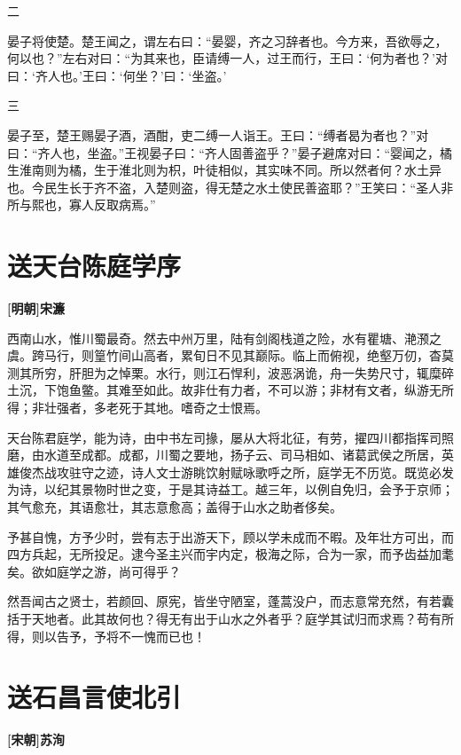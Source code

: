 \documentclass[UTF8,titlepage,oneside]{ctexbook}
\begin{document}
二

晏子将使楚。楚王闻之，谓左右曰：“晏婴，齐之习辞者也。今方来，吾欲辱之，何以也？”左右对曰：“为其来也，臣请缚一人，过王而行，王曰：‘何为者也？’对曰：‘齐人也。’王曰：‘何坐？’曰：‘坐盗。’


三

晏子至，楚王赐晏子酒，酒酣，吏二缚一人诣王。王曰：“缚者曷为者也？”对曰：“齐人也，坐盗。”王视晏子曰：“齐人固善盗乎？”晏子避席对曰：“婴闻之，橘生淮南则为橘，生于淮北则为枳，叶徒相似，其实味不同。所以然者何？水土异也。今民生长于齐不盗，入楚则盗，得无楚之水土使民善盗耶？”王笑曰：“圣人非所与熙也，寡人反取病焉。”



\chapter*{送天台陈庭学序}
\begin{center}
	\textbf{[明朝]宋濂}
\end{center}


西南山水，惟川蜀最奇。然去中州万里，陆有剑阁栈道之险，水有瞿塘、滟滪之虞。跨马行，则篁竹间山高者，累旬日不见其巅际。临上而俯视，绝壑万仞，杳莫测其所穷，肝胆为之悼栗。水行，则江石悍利，波恶涡诡，舟一失势尺寸，辄糜碎土沉，下饱鱼鳖。其难至如此。故非仕有力者，不可以游；非材有文者，纵游无所得；非壮强者，多老死于其地。嗜奇之士恨焉。


天台陈君庭学，能为诗，由中书左司掾，屡从大将北征，有劳，擢四川都指挥司照磨，由水道至成都。成都，川蜀之要地，扬子云、司马相如、诸葛武侯之所居，英雄俊杰战攻驻守之迹，诗人文士游眺饮射赋咏歌呼之所，庭学无不历览。既览必发为诗，以纪其景物时世之变，于是其诗益工。越三年，以例自免归，会予于京师；其气愈充，其语愈壮，其志意愈高；盖得于山水之助者侈矣。


予甚自愧，方予少时，尝有志于出游天下，顾以学未成而不暇。及年壮方可出，而四方兵起，无所投足。逮今圣主兴而宇内定，极海之际，合为一家，而予齿益加耄矣。欲如庭学之游，尚可得乎？


然吾闻古之贤士，若颜回、原宪，皆坐守陋室，蓬蒿没户，而志意常充然，有若囊括于天地者。此其故何也？得无有出于山水之外者乎？庭学其试归而求焉？苟有所得，则以告予，予将不一愧而已也！



\chapter*{送石昌言使北引}
\begin{center}
	\textbf{[宋朝]苏洵}
\end{center}
\end{document}
